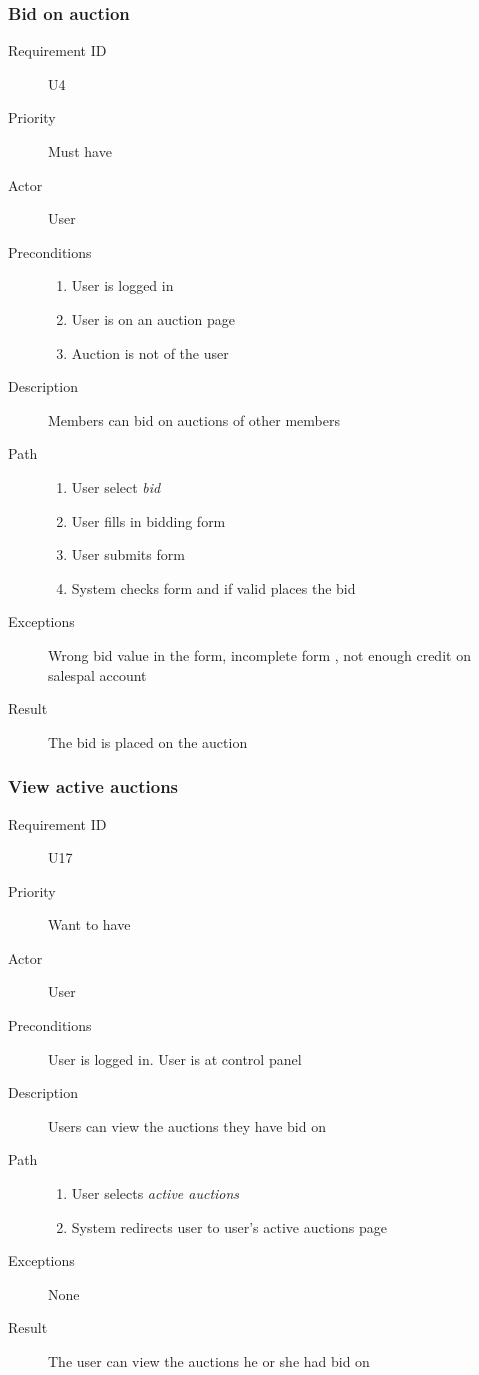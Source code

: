 		\subsubsection{Bid on auction}
			\begin{description}
				\item[Requirement ID] U4
				\item[Priority] Must have
				\item[Actor] User
				\item[Preconditions] 
 					\begin{enumerate}
						\item User is logged in
						\item User is on an auction page
						\item Auction is not of the user
					\end{enumerate}
				\item[Description] Members can bid on auctions of other members
				\item[Path]
 					\begin{enumerate}
						\item User select \emph{bid}
						\item User fills in bidding form
						\item User submits form
						\item System checks form and if valid places the bid
					\end{enumerate}
				\item[Exceptions] Wrong bid value in the form, incomplete form
				, not enough credit on salespal account
				\item[Result] The bid is placed on the auction
			\end{description}
		\subsubsection{View active auctions}
			\begin{description}
				\item[Requirement ID] U17
				\item[Priority] Want to have
				\item[Actor] User
				\item[Preconditions] User is logged in. User is at control panel
				\item[Description] Users can view the auctions they have bid on
				\item[Path]
 					\begin{enumerate}
						\item User selects \emph{active auctions}
						\item System redirects user to user's active auctions page
					\end{enumerate}
				\item[Exceptions] None
				\item[Result] The user can view the auctions he or she had bid on
			\end{description}
